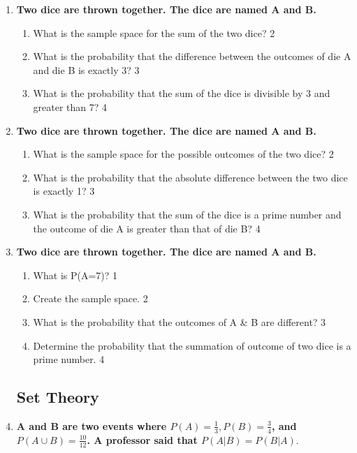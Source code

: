 \documentclass[a4paper,oneside]{book}
\begin{document}
\begin{enumerate}
  \item  
  \textbf{Two dice are thrown together. The dice are named A and B.}  

  \begin{enumerate}  
    \item  
    	What is the sample space for the sum of the two dice? \hfill 2  
    \item  
    	What is the probability that the difference between the outcomes of die A and die B is exactly 3? \hfill 3  
    \item  
    	What is the probability that the sum of the dice is divisible by 3 and greater than 7? \hfill 4  
  \end{enumerate}  

  
  \item  
  \textbf{Two dice are thrown together. The dice are named A and B.}  

  \begin{enumerate}  
    \item  
    	What is the sample space for the possible outcomes of the two dice? \hfill 2  
    \item  
    	What is the probability that the absolute difference between the two dice is exactly 1? \hfill 3  
    \item  
    	What is the probability that the sum of the dice is a prime number and the outcome of die A is greater than that of die B? \hfill 4  
  \end{enumerate}  


 \item
	  \textbf{Two dice are thrown together. The dice are named A and B.} 
  
  \begin{enumerate}
    \item
	What is P(A=7)? \hfill 1
    \item
	Create the sample space. \hfill 2
    \item  
	What is the probability that the outcomes of A \& B are different? \hfill 3
    \item
	Determine the probability that the summation of outcome of two dice is a prime number. \hfill 4
  \end{enumerate}


\subsection{Set Theory}

  \item
	  \textbf{A and B are two events where $P(A) = \frac 13, P(B) = \frac 34$, and $P(A\cup B) = \frac{10}{12}$. A professor said that $P(A|B) = P(B|A)$}. 
  

\end{enumerate}
\end{document}
